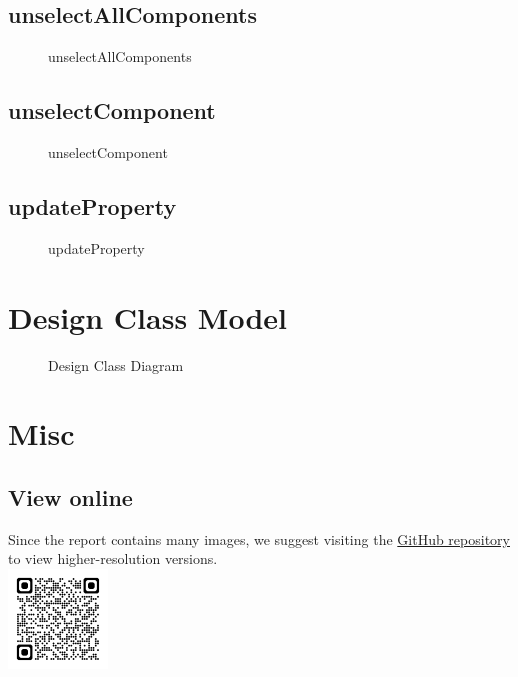 \documentclass[12pt]{article}
\begin{document}
\subsection{unselectAllComponents}
\begin{figure}[H]
  \centering
    
  \caption{unselectAllComponents}
\end{figure}

\subsection{unselectComponent}
\begin{figure}[H]
  \centering
    
  \caption{unselectComponent}
\end{figure}

\subsection{updateProperty}
\begin{figure}[H]
  \centering
  
  \caption{updateProperty}
\end{figure}




\section{Design Class Model}

\begin{figure}[H]
  \centering
    
  \caption{Design Class Diagram}
\end{figure}





\section{Misc}
\subsection{View online}
Since the report contains many images, we suggest visiting the \href{https://github.com/CSIEHaTerX/Dr.UML/}{GitHub repository} to view higher-resolution versions.\\
\includegraphics[]{assets/repoQRCode.png}
\end{document}
